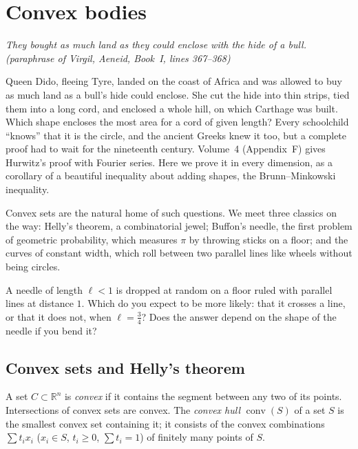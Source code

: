 \chapter{Convex bodies}\label{geometry:ch:convex}

\begin{center}\itshape
They bought as much land as they could enclose with the hide of a bull.
\upshape(paraphrase of Virgil, \emph{Aeneid}, Book~I, lines 367--368)
\end{center}

Queen Dido, fleeing Tyre, landed on the coast of Africa and was allowed to buy as much land as a bull's hide could enclose. She cut the hide into thin strips,
tied them into a long cord, and enclosed a whole hill, on which Carthage was built. Which shape encloses the most area for a cord of given length? Every
schoolchild ``knows'' that it is the circle, and the ancient Greeks knew it too, but a complete proof had to wait for the nineteenth century. Volume~4
(Appendix~F) gives Hurwitz's proof with Fourier series. Here we prove it in every dimension, as a corollary of a beautiful inequality about adding
shapes, the Brunn--Minkowski inequality.

Convex sets are the natural home of such questions. We meet three classics on the way: Helly's theorem, a combinatorial jewel; Buffon's needle, the
first problem of geometric probability, which measures $\pi$ by throwing sticks on a floor; and the curves of constant width, which roll between two parallel
lines like wheels without being circles.

\begin{think}
A needle of length $\ell<1$ is dropped at random on a floor ruled with parallel lines at distance $1$. Which do you expect to be more likely: that it
crosses a line, or that it does not, when $\ell=\frac34$? Does the answer depend on the shape of the needle if you bend it?
\end{think}

\section{Convex sets and Helly's theorem}

A set $C\subset\mathbb R^n$ is \emph{convex} if it contains the segment between any two of its points. Intersections of convex sets are convex. The
\emph{convex hull} $\operatorname{conv}(S)$ of a set $S$ is the smallest convex set containing it; it consists of the convex combinations
$\sum t_ix_i$ ($x_i\in S$, $t_i\ge0$, $\sum t_i=1$) of finitely many points of $S$.

